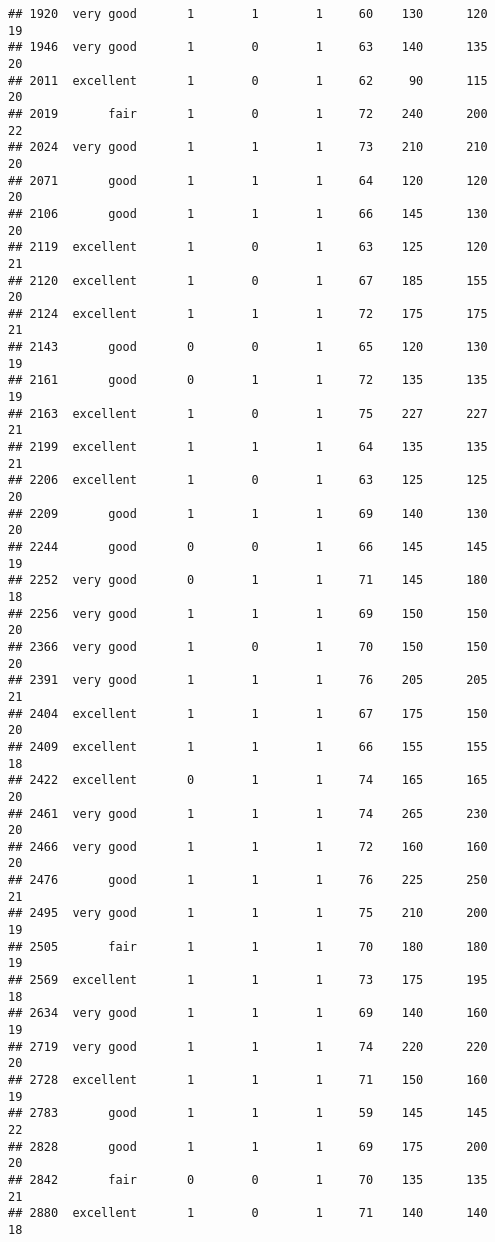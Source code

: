 \documentclass[]{article}
\begin{document}
\begin{verbatim}
## 1920  very good       1        1        1     60    130      120  19
## 1946  very good       1        0        1     63    140      135  20
## 2011  excellent       1        0        1     62     90      115  20
## 2019       fair       1        0        1     72    240      200  22
## 2024  very good       1        1        1     73    210      210  20
## 2071       good       1        1        1     64    120      120  20
## 2106       good       1        1        1     66    145      130  20
## 2119  excellent       1        0        1     63    125      120  21
## 2120  excellent       1        0        1     67    185      155  20
## 2124  excellent       1        1        1     72    175      175  21
## 2143       good       0        0        1     65    120      130  19
## 2161       good       0        1        1     72    135      135  19
## 2163  excellent       1        0        1     75    227      227  21
## 2199  excellent       1        1        1     64    135      135  21
## 2206  excellent       1        0        1     63    125      125  20
## 2209       good       1        1        1     69    140      130  20
## 2244       good       0        0        1     66    145      145  19
## 2252  very good       0        1        1     71    145      180  18
## 2256  very good       1        1        1     69    150      150  20
## 2366  very good       1        0        1     70    150      150  20
## 2391  very good       1        1        1     76    205      205  21
## 2404  excellent       1        1        1     67    175      150  20
## 2409  excellent       1        1        1     66    155      155  18
## 2422  excellent       0        1        1     74    165      165  20
## 2461  very good       1        1        1     74    265      230  20
## 2466  very good       1        1        1     72    160      160  20
## 2476       good       1        1        1     76    225      250  21
## 2495  very good       1        1        1     75    210      200  19
## 2505       fair       1        1        1     70    180      180  19
## 2569  excellent       1        1        1     73    175      195  18
## 2634  very good       1        1        1     69    140      160  19
## 2719  very good       1        1        1     74    220      220  20
## 2728  excellent       1        1        1     71    150      160  19
## 2783       good       1        1        1     59    145      145  22
## 2828       good       1        1        1     69    175      200  20
## 2842       fair       0        0        1     70    135      135  21
## 2880  excellent       1        0        1     71    140      140  18

\end{verbatim}
\end{document}
